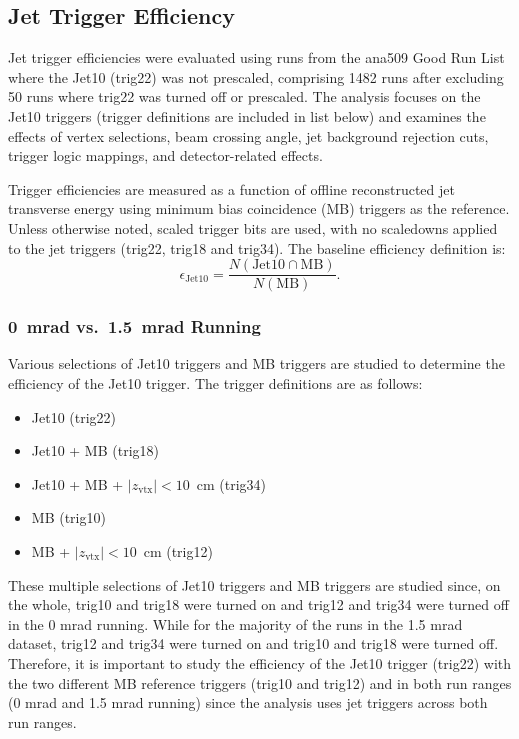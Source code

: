 \subsection{Jet Trigger Efficiency}
\label{sec:jet_trigger_efficiency}

Jet trigger efficiencies were evaluated using runs from the ana509 Good Run List where the Jet10 (trig22) was not prescaled, comprising 1482 runs after excluding 50 runs where trig22 was turned off or prescaled. 
The analysis focuses on the Jet10 triggers (trigger definitions are included in list below) and examines the effects of vertex selections, beam crossing angle, jet background rejection cuts, trigger logic mappings, and detector-related effects.

Trigger efficiencies are measured as a function of offline reconstructed jet transverse energy using minimum bias coincidence (MB) triggers as the reference. 
Unless otherwise noted, scaled trigger bits are used, with no scaledowns applied to the jet triggers (trig22, trig18 and trig34). 
The baseline efficiency definition is:
\begin{equation}
\epsilon_{\mathrm{Jet10}} =
\frac{N(\mathrm{Jet10} \cap \mathrm{MB})}{N(\mathrm{MB})}.
\end{equation}

\subsubsection{0~mrad vs.\ 1.5~mrad Running}

Various selections of Jet10 triggers and MB triggers are studied to determine the efficiency of the Jet10 trigger. The trigger definitions are as follows:
\begin{itemize}
    \item Jet10 (trig22)
    \item Jet10 + MB (trig18)
    \item Jet10 + MB + $|z_{\mathrm{vtx}}| < 10$~cm (trig34)
    \item MB (trig10)
    \item MB + $|z_{\mathrm{vtx}}| < 10$~cm (trig12)
\end{itemize}
These multiple selections of Jet10 triggers and MB triggers are studied since, on the whole, trig10 and trig18 were turned on and trig12 and trig34 were turned off in the 0 mrad running.
While for the majority of the runs in the 1.5 mrad dataset, trig12 and trig34 were turned on and trig10 and trig18 were turned off.
Therefore, it is important to study the efficiency of the Jet10 trigger (trig22) with the two different MB reference triggers (trig10 and trig12) and in both run ranges (0 mrad and 1.5 mrad running) since the analysis uses jet triggers across both run ranges.

